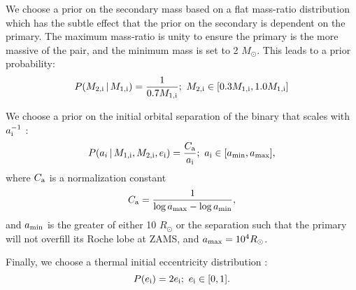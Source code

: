 \documentclass[usenatbib]{mnras}
\newcommand{\given}{\,|\,}
\newcommand{\Msun}{\ifmmode {M_{\odot}}\else${M_{\odot}}$\fi}
\begin{document}
We choose a prior on the secondary mass based on a flat mass-ratio distribution which has the subtle effect that the prior on the secondary is dependent on the primary. The maximum mass-ratio is unity to ensure the primary is the more massive of the pair, and the minimum mass is set to 2 \Msun. 
This leads to a prior probability:
\begin{equation}
P(M_{\rm 2,i} \given M_{\rm 1,i}) = \frac{1}{0.7 M_{\rm 1,i}};\ M_{\rm 2,i} \in [0.3 M_{\rm 1,i}, 1.0 M_{\rm 1,i}]
\end{equation}

We choose a prior on the initial orbital separation of the binary that scales with $a_{\rm i}^{-1}$ \citep{abt83}:
\begin{equation}
P(a_i \given M_{\rm 1,i}, M_{\rm 2,i}, e_{\rm i}) = \frac{C_{\rm a}}{a_{\rm i}};\ a_{\rm i} \in [a_{\rm min}, a_{\rm max}],
\end{equation}
where $C_{\rm a}$ is a normalization constant
\begin{equation}
C_{\rm a} = \frac{1}{\log a_{\rm max} - \log a_{\rm min}},
\end{equation}
and $a_{\rm min}$ is the greater of either 10 $R_{\odot}$ or the separation such that the primary will not overfill its Roche lobe at ZAMS, and $a_{\rm max} = 10^4 R_{\odot}$. 

Finally, we choose a thermal initial eccentricity distribution \citep{duquennoy91}:
\begin{equation}
P(e_{\rm i}) = 2e_{\rm i};\ e_{\rm i} \in[0,1].
\end{equation}
\end{document}
